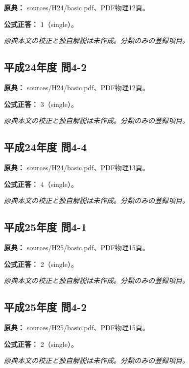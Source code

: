 \noindent\textbf{原典：} sources/H24/basic.pdf、PDF物理12頁。

\textbf{公式正答：} 1（single）。

\par\textit{原典本文の校正と独自解説は未作成。分類のみの登録項目。}

\subsection{平成24年度 問4-2}
\label{q:h24-reg-basic-4-2}

\noindent\textbf{原典：} sources/H24/basic.pdf、PDF物理12頁。

\textbf{公式正答：} 3（single）。

\par\textit{原典本文の校正と独自解説は未作成。分類のみの登録項目。}

\subsection{平成24年度 問4-4}
\label{q:h24-reg-basic-4-4}

\noindent\textbf{原典：} sources/H24/basic.pdf、PDF物理13頁。

\textbf{公式正答：} 4（single）。

\par\textit{原典本文の校正と独自解説は未作成。分類のみの登録項目。}

\subsection{平成25年度 問4-1}
\label{q:h25-reg-basic-4-1}

\noindent\textbf{原典：} sources/H25/basic.pdf、PDF物理15頁。

\textbf{公式正答：} 2（single）。

\par\textit{原典本文の校正と独自解説は未作成。分類のみの登録項目。}

\subsection{平成25年度 問4-2}
\label{q:h25-reg-basic-4-2}

\noindent\textbf{原典：} sources/H25/basic.pdf、PDF物理15頁。

\textbf{公式正答：} 2（single）。

\par\textit{原典本文の校正と独自解説は未作成。分類のみの登録項目。}

